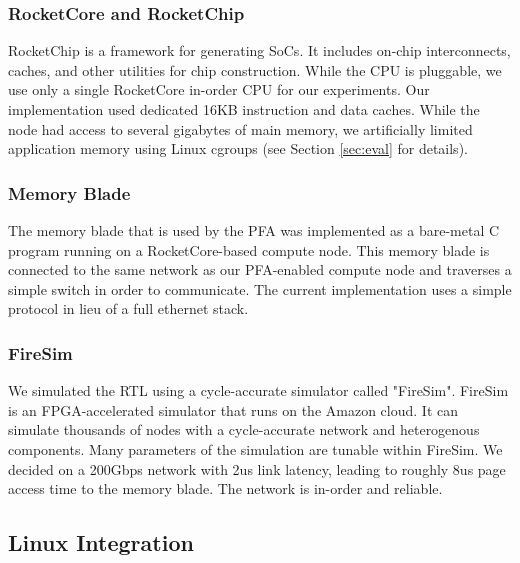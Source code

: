 \subsubsection{RocketCore and RocketChip}
RocketChip\cite{rocketchip} is a framework for generating SoCs. It includes
on-chip interconnects, caches, and other utilities for chip construction. While
the CPU is pluggable, we use only a single RocketCore in-order CPU for our
experiments. Our implementation used dedicated 16KB instruction and data
caches. While the node had access to several gigabytes of main memory, we
artificially limited application memory using Linux cgroups (see Section
\ref{sec:eval} for details).

\subsubsection{Memory Blade}
The memory blade that is used by the PFA was implemented as a bare-metal C
program running on a RocketCore-based compute node. This memory blade is
connected to the same network as our PFA-enabled compute node and traverses a
simple switch in order to communicate. The current implementation uses a simple
protocol in lieu of a full ethernet stack. 

\subsubsection{FireSim}
We simulated the RTL using a cycle-accurate simulator called
"FireSim"\cite{firesim}. FireSim is an FPGA-accelerated simulator that runs on
the Amazon cloud. It can simulate thousands of nodes with a cycle-accurate
network and heterogenous components.  Many parameters of the simulation are
tunable within FireSim. We decided on a 200Gbps network with 2us link latency,
leading to roughly 8us page access time to the memory blade. The network is
in-order and reliable. 

\subsection{Linux Integration} \label{sec:linuxImpl}
    
